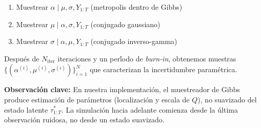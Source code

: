 \begin{enumerate}
    \item Muestrear $\alpha \mid \mu, \sigma, Y_{1:T}$ (metropolis dentro de Gibbs)
    \item Muestrear $\mu \mid \alpha, \sigma, Y_{1:T}$ (conjugado gaussiano)
    \item Muestrear $\sigma \mid \alpha, \mu, Y_{1:T}$ (conjugado inverso-gamma)
\end{enumerate}

Despu\'{e}s de $N_{\text{iter}}$ iteraciones y un per\'{\'i}odo de \emph{burn-in},
obtenemos muestras $\{(\alpha^{(i)}, \mu^{(i)}, \sigma^{(i)})\}_{i=1}^{N}$ que caracterizan
la incertidumbre param\'{e}trica.

\textbf{Observaci\'{o}n clave:} En nuestra implementaci\'{o}n, el muestreador de Gibbs
produce estimaci\'{o}n de par\'{a}metros (localizaci\'{o}n y escala de $Q$),
no suavizado del estado latente $\tau^*_{1:T}$.
La simulaci\'{o}n hacia adelante comienza desde la \'{u}ltima observaci\'{o}n ruidosa,
no desde un estado suavizado.
